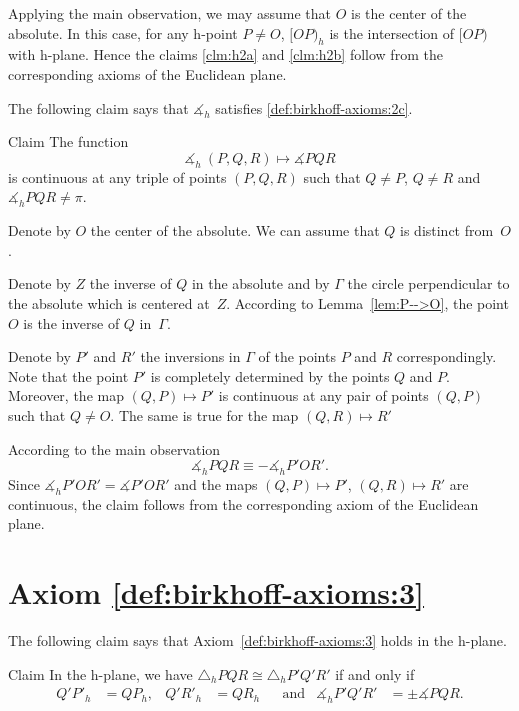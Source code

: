 Applying the main observation, 
we may assume that $O$ is the center of the absolute.
In this case, for any h-point $P\ne O$,
$[OP)_h$ is the intersection of $[OP)$ with h-plane.
Hence the claims \ref{clm:h2a} and \ref{clm:h2b} 
follow from the corresponding axioms of the Euclidean plane.
\qeds

The following claim says that
$\measuredangle_h$ satisfies
 \ref{def:birkhoff-axioms:2c}.

\begin{thm}{Claim}\label{clm:h2c}
The function 
$$\measuredangle_h\:(P,Q,R)\mapsto\measuredangle P Q R$$
is continuous at any triple of points $(P,Q,R)$
such that $Q\ne P$, $Q\ne R$ and $\measuredangle_h P Q R\ne\pi$.
\end{thm}

Denote by $O$ the center of the absolute.
We can assume that $Q$ is distinct from~$O$.

Denote by $Z$ the inverse of $Q$ in the absolute
and by $\Gamma$ the circle perpendicular to the absolute which is centered at~$Z$.
According to Lemma~\ref{lem:P-->O},
the point $O$ is the inverse of $Q$ in~$\Gamma$.

Denote by $P'$ and $R'$ the inversions in $\Gamma$ of the points $P$ and $R$ correspondingly.
Note that the point $P'$ is completely determined by the points $Q$ and $P$.
Moreover, the map $(Q,P)\mapsto P'$ is continuous at any pair of points $(Q,P)$ such that $Q\ne O$.
The same is true for the map $(Q,R)\mapsto R'$

According to the main observation 
$$\measuredangle_h P Q R\equiv -\measuredangle_h P' O R'.$$
Since $\measuredangle_h P' O R'=\measuredangle P' O R'$ and 
the maps $(Q,P)\mapsto P'$, $(Q,R)\mapsto R'$ are continuous,
the claim follows from the corresponding axiom of the Euclidean plane.
\qeds

\section*{Axiom \ref{def:birkhoff-axioms:3}}

The following claim says that Axiom~\ref{def:birkhoff-axioms:3} holds in the h-plane.

\begin{thm}{Claim}
In the h-plane, we have
$\triangle_h P Q R 
\cong
\triangle_h P' Q' R'$
if and only if 
\begin{align*}
Q' P'_h&=Q P_h, & Q' R'_h&= Q R_h &&\text{and}
&\measuredangle_h P' Q' R'&=\pm\measuredangle P Q R.
\end{align*}
 
\end{thm}

